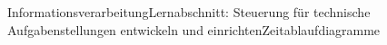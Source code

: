 \documentclass[oneside,openany,headings=optiontotoc,11pt,numbers=noenddot]{scrreprt}
\begin{document}
\begin{worksheet}{Informationsverarbeitung}{Lernabschnitt: Steuerung für technische Aufgabenstellungen entwickeln und einrichten}{Zeitablaufdiagramme}
\begin{framed}
\begin{minipage}{0.65\textwidth}
\begin{minipage}{0.65\textwidth}
				\end{minipage}
			\end{minipage}\\
		\end{framed}
		
	\end{worksheet}
\end{document}
